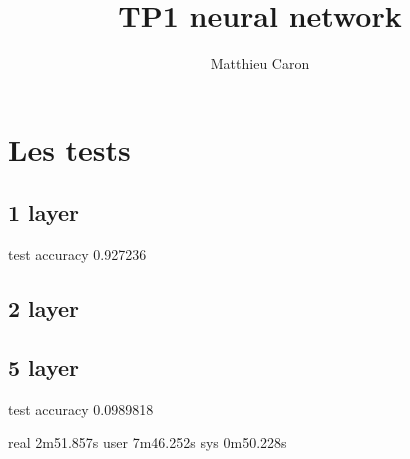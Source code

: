 \documentclass[a4paper,10pt]{report}
\title{TP1 neural network}
\author{Matthieu Caron}
\begin{document}
\maketitle

\section{Les tests}
  \subsection{1 layer}
    test accuracy 0.927236
  
  \subsection{2 layer}
  
  \subsection{5 layer}
  test accuracy 0.0989818

  real	2m51.857s
  user	7m46.252s
  sys	0m50.228s


\begin{abstract}
\end{abstract}
\end{document}
